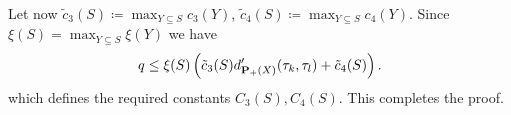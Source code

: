 Let now $\tilde c_3(S)\coloneqq \max_{Y\subseteq S} c_3(Y)$, $\tilde c_4(S)\coloneqq \max_{Y\subseteq S} c_4(Y)$. Since\linebreak $\xi(S) = \max_{Y\subseteq S} \xi(Y)$ we have
$$
q \leq \xi(S)\left( \tilde c_3(S) d'_{{\mathbf{P}_+}(X)}(\tau_k,\tau_l)+\tilde c_4(S) \right).
$$
which defines the required constants $C_3(S),C_4(S)$. This completes the proof.